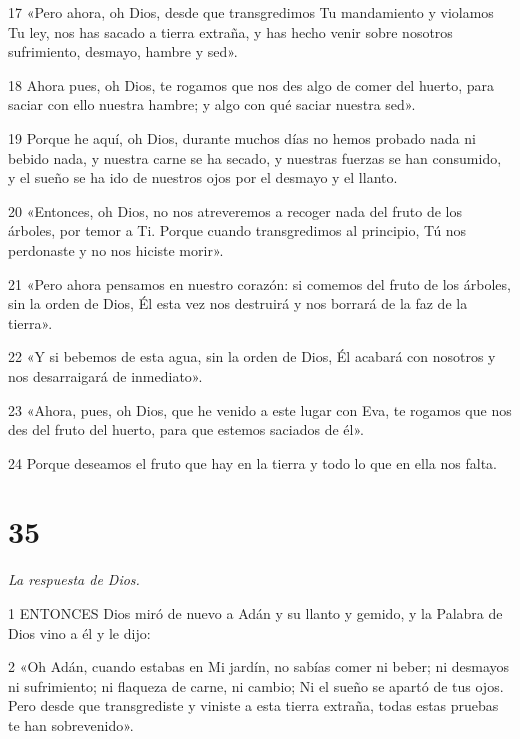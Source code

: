 \par 17 «Pero ahora, oh Dios, desde que transgredimos Tu mandamiento y violamos Tu ley, nos has sacado a tierra extraña, y has hecho venir sobre nosotros sufrimiento, desmayo, hambre y sed».

\par 18 Ahora pues, oh Dios, te rogamos que nos des algo de comer del huerto, para saciar con ello nuestra hambre; y algo con qué saciar nuestra sed».

\par 19 Porque he aquí, oh Dios, durante muchos días no hemos probado nada ni bebido nada, y nuestra carne se ha secado, y nuestras fuerzas se han consumido, y el sueño se ha ido de nuestros ojos por el desmayo y el llanto.

\par 20 «Entonces, oh Dios, no nos atreveremos a recoger nada del fruto de los árboles, por temor a Ti. Porque cuando transgredimos al principio, Tú nos perdonaste y no nos hiciste morir».

\par 21 «Pero ahora pensamos en nuestro corazón: si comemos del fruto de los árboles, sin la orden de Dios, Él esta vez nos destruirá y nos borrará de la faz de la tierra».

\par 22 «Y si bebemos de esta agua, sin la orden de Dios, Él acabará con nosotros y nos desarraigará de inmediato».

\par 23 «Ahora, pues, oh Dios, que he venido a este lugar con Eva, te rogamos que nos des del fruto del huerto, para que estemos saciados de él».

\par 24 Porque deseamos el fruto que hay en la tierra y todo lo que en ella nos falta.

\chapter{35}

\par \textit{La respuesta de Dios.}

\par 1 ENTONCES Dios miró de nuevo a Adán y su llanto y gemido, y la Palabra de Dios vino a él y le dijo:

\par 2 «Oh Adán, cuando estabas en Mi jardín, no sabías comer ni beber; ni desmayos ni sufrimiento; ni flaqueza de carne, ni cambio; Ni el sueño se apartó de tus ojos. Pero desde que transgrediste y viniste a esta tierra extraña, todas estas pruebas te han sobrevenido».

